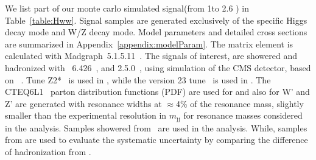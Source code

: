 We list part of our monte carlo simulated signal(from 1\TeVcc to 2.6 \TeVcc) 
in 
Table~\ref{table:Hww}. 
Signal samples are generated exclusively of the specific 
Higgs decay mode and W/Z decay mode. 
Model parameters and detailed cross sections are summarized in 
Appendix~\ref{appendix:modelParam}.
The matrix element is calculated with Madgraph~5.1.5.11~\cite{madgraph}. 
The signals of interest,
are showered and hadronized with 
\PYTHIA~6.426~\cite{pythia}, and \HERWIG{++} 2.5.0~\cite{herwig}, 
using simulation of the
CMS detector, based on \GEANTfour~\cite{refGEANT}. Tune
Z2*~\cite{bib_tunez1}
is used in \PYTHIA, while the version 23 tune~\cite{herwig} is used in
\HERWIG{++}. The CTEQ6L1~\cite{cteq} parton distribution functions
(PDF) are used for \PYTHIA and also for \HERWIG{++}
W' and Z' are generated with resonance widths
at $\approx$4\% of the resonance mass, slightly smaller than
the experimental resolution in $m_\mathrm{jj}$ for resonance masses
considered in the analysis. Samples showered from
 \PYTHIA~are used in the analysis. %
While, samples from \HERWIG{++} are used to evaluate the systematic 
uncertainty by comparing the difference of hadronization from \PYTHIA.






